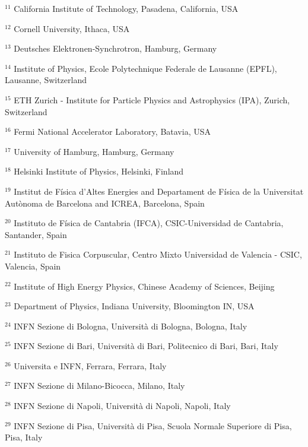 \par {\footnotesize $^{11}$ California Institute of Technology, Pasadena, California, USA}
\par {\footnotesize $^{12}$ Cornell University, Ithaca, USA}
\par {\footnotesize $^{13}$ Deutsches Elektronen-Synchrotron, Hamburg, Germany}
\par {\footnotesize $^{14}$ Institute of Physics, Ecole Polytechnique Federale de Lausanne (EPFL), Lausanne, Switzerland}
\par {\footnotesize $^{15}$ ETH Zurich - Institute for Particle Physics and Astrophysics (IPA), Zurich, Switzerland}
\par {\footnotesize $^{16}$ Fermi National Accelerator Laboratory, Batavia, USA}
\par {\footnotesize $^{17}$ University of Hamburg, Hamburg, Germany}
\par {\footnotesize $^{18}$ Helsinki Institute of Physics, Helsinki, Finland}
\par {\footnotesize $^{19}$ Institut de Física d’Altes Energies and Departament de Física de la Universitat Autònoma de Barcelona and ICREA, Barcelona, Spain}
\par {\footnotesize $^{20}$ Instituto de Física de Cantabria (IFCA), CSIC-Universidad de Cantabria, Santander, Spain}
\par {\footnotesize $^{21}$ Instituto de Fisica Corpuscular, Centro Mixto Universidad de Valencia - CSIC, Valencia, Spain}
\par {\footnotesize $^{22}$ Institute of High Energy Physics, Chinese Academy of Sciences, Beijing}
\par {\footnotesize $^{23}$ Department of Physics, Indiana University, Bloomington IN, USA}
\par {\footnotesize $^{24}$ INFN Sezione di Bologna, Università di Bologna, Bologna, Italy}
\par {\footnotesize $^{25}$ INFN Sezione di Bari, Università di Bari, Politecnico di Bari, Bari, Italy}
\par {\footnotesize $^{26}$ Universita e INFN, Ferrara, Ferrara, Italy}
\par {\footnotesize $^{27}$ INFN Sezione di Milano-Bicocca, Milano, Italy}
\par {\footnotesize $^{28}$ INFN Sezione di Napoli, Università di Napoli, Napoli, Italy}
\par {\footnotesize $^{29}$ INFN Sezione di Pisa, Università di Pisa, Scuola Normale Superiore di Pisa, Pisa, Italy}
